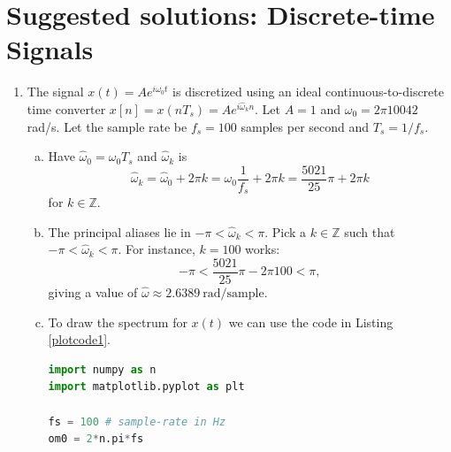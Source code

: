 \newpage
\section{Suggested solutions: Discrete-time Signals}
\begin{enumerate}
\item The signal $x(t)=Ae^{i\omega_{0}t}$ is discretized using an ideal continuous-to-discrete time converter $x[n]=x(nT_{s})=Ae^{i\hat{\omega}_{k}n}$. Let $A=1$ and $\omega_{0}=2\pi 10042$ rad/s. Let the sample rate be $f_{s}=100$ samples per second and $T_{s}=1/f_{s}$.

\begin{enumerate}[a)]
\item Have $\hat{\omega}_{0}=\omega_{0}T_{s}$ and $\hat{\omega}_{k}$ is
$$\hat{\omega}_{k}=\hat{\omega}_{0}+2\pi k=\omega_{0}\frac{1}{f_{s}}+2\pi k=\frac{5021}{25}\pi+2\pi k$$
for $k\in\mathbb{Z}$. 

\item The principal aliases lie in $-\pi<\hat{\omega}_{k}<\pi$. Pick a $k\in\mathbb{Z}$ such that $-\pi<\hat{\omega}_{k}<\pi$. For instance, $k=100$ works:
$$-\pi < \frac{5021}{25}\pi-2\pi 100 < \pi,$$
giving a value of $\hat{\omega}\approx2.6389\ \text{rad/sample}$. 

\item To draw the spectrum for $x(t)$ we can use the code in Listing \ref{plotcode1}.

\begin{lstlisting}[language=Python, caption=Spectrum of $x(t)$,label=plotcode1]
import numpy as n
import matplotlib.pyplot as plt

fs = 100 # sample-rate in Hz
om0 = 2*n.pi*fs


\end{lstlisting}
\end{enumerate}
\end{enumerate}
